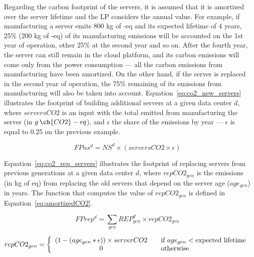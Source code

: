 Regarding the carbon footprint of the servers, it is assumed that it is amortized over the server lifetime and the LP considers the annual value. For example, if manufacturing a server emits 800 kg of -eq and its expected lifetime of 4 years, 25\% (200 kg of -eq) of its manufacturing emissions will be accounted on the 1st year of operation, other 25\% at the second year and so on. After the fourth year, the server can still remain in the cloud platform, and its carbon emissions will come only from the power consumption --- all the carbon emissions from manufacturing have been amortized. On the other hand, if the server is replaced in the second year of operation, the 75\% remaining of its emissions from manufacturing will also be taken into account. Equation~\eqref{eq:co2_new_servers} illustrates the footprint of building additional servers at a given data center $d$, where $serversCO2$ is an input with the total  emitted from manufacturing the server (in $g\,\ch{CO2}-eq$), and $\epsilon$ the share of the emissions by year ---  $\epsilon$ is equal to 0.25 on the previous example.


\begin{equation} \label{eq:co2_new_servers}
FPns^d = NS^d \times (serversCO2 \times \epsilon)	
\end{equation}


Equation~\eqref{eq:co2_rep_servers} illustrates the footprint of replacing servers from previous generations at a given data center $d$, where $repCO2_{gen}$ is the emissions (in kg of  eq) from replacing the old servers that depend on the server age ($age_{gen}$) in years. The function that computes the value of  $repCO2_{gen}$  is defined in Equation~\eqref{eq:amortizedCO2}. 

\begin{equation} \label{eq:co2_rep_servers}
FPrep^d = \sum_{gen} REP_{gen}^d  \times repCO2_{gen}
\end{equation}


\begin{equation} \label{eq:amortizedCO2}
repCO2_{gen} =  \left\{ 
  \begin{array}{ c l }
    (1 - (age_{gen} * \epsilon)) \times serverCO2   & \quad \textrm{if $age_{gen}$}  <  \textrm{expected lifetime}      \\
    0     & \quad  \textrm{otherwise}   \\
  \end{array}
\right.
\end{equation}


